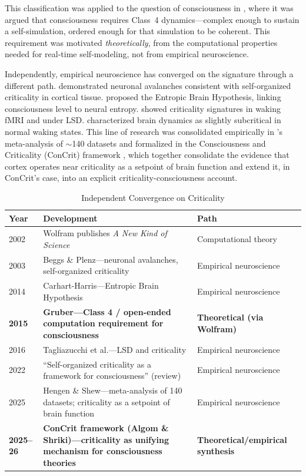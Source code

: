 \documentclass[12pt]{article}
\begin{document}
This classification was applied to the question of consciousness in \citet{Gruber2015}, where it was argued that consciousness requires Class~4 dynamics---\hspace{0pt}complex enough to sustain a self-simulation, ordered enough for that simulation to be coherent. This requirement was motivated \emph{theoretically}, from the computational properties needed for real-time self-modeling, not from empirical neuroscience.

Independently, empirical neuroscience has converged on the signature through a different path. \citet{Beggs2003} demonstrated neuronal avalanches consistent with self-organized criticality in cortical tissue. \citet{CarhartHarris2014} proposed the Entropic Brain Hypothesis, linking consciousness level to neural entropy. \citet{Tagliazucchi2012,Tagliazucchi2016} showed criticality signatures in waking fMRI and under LSD. \citet{Priesemann2013} characterized brain dynamics as slightly subcritical in normal waking states. This line of research was consolidated empirically in \citeauthor{HengenShew2025}'s \citeyearpar{HengenShew2025} meta-analysis of $\sim$140 datasets and formalized in the Consciousness and Criticality (ConCrit) framework \citep{AlgomShriki2026}, which together consolidate the evidence that cortex operates near criticality as a setpoint of brain function and extend it, in ConCrit's case, into an explicit criticality-consciousness account.

\begin{table}[htbp]
\centering
\caption{Independent Convergence on Criticality}
\label{tab:criticality-convergence}
\small
\renewcommand{\arraystretch}{1.4}
\begin{tabularx}{\textwidth}{>{\raggedright}p{1.5cm} X >{\raggedright\arraybackslash}p{3.5cm}}
\toprule
\textbf{Year} & \textbf{Development} & \textbf{Path} \\
\midrule
2002 & Wolfram publishes \emph{A New Kind of Science} & Computational theory \\
2003 & Beggs \& Plenz---neuronal avalanches, self-organized criticality & Empirical neuroscience \\
2014 & Carhart-Harris---Entropic Brain Hypothesis & Empirical neuroscience \\
\textbf{2015} & \textbf{Gruber---Class 4 / open-ended computation requirement for consciousness} & \textbf{Theoretical (via Wolfram)} \\
2016 & Tagliazucchi et al.---LSD and criticality & Empirical neuroscience \\
2022 & ``Self-organized criticality as a framework for consciousness'' (review) & Empirical neuroscience \\
2025 & Hengen \& Shew---meta-analysis of 140 datasets; criticality as a setpoint of brain function & Empirical neuroscience \\
\textbf{2025--26} & \textbf{ConCrit framework (Algom \& Shriki)---criticality as unifying mechanism for consciousness theories} & \textbf{Theoretical/empirical synthesis} \\
\bottomrule
\end{tabularx}
\end{table}
\end{document}
